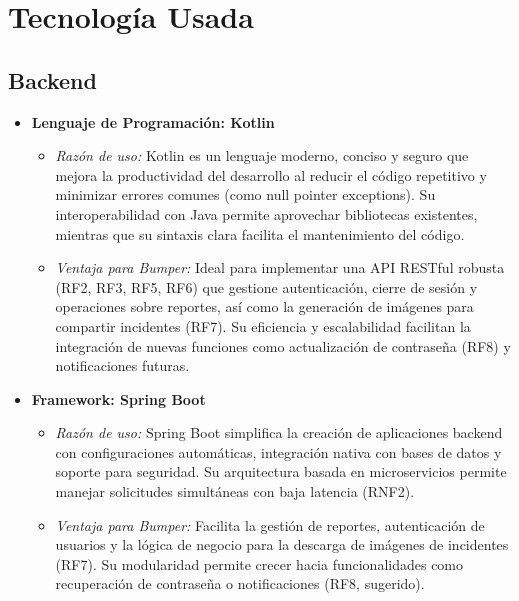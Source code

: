 \section{Tecnología Usada}

\subsection*{Backend}
\begin{itemize}
    \item \textbf{Lenguaje de Programación: Kotlin}
    \begin{itemize}
        \item \textit{Razón de uso:} Kotlin es un lenguaje moderno, conciso y seguro que mejora la productividad del desarrollo al reducir el código repetitivo y minimizar errores comunes (como null pointer exceptions). Su interoperabilidad con Java permite aprovechar bibliotecas existentes, mientras que su sintaxis clara facilita el mantenimiento del código.
        \item \textit{Ventaja para Bumper:} Ideal para implementar una API RESTful robusta (RF2, RF3, RF5, RF6) que gestione autenticación, cierre de sesión y operaciones sobre reportes, así como la generación de imágenes para compartir incidentes (RF7). Su eficiencia y escalabilidad facilitan la integración de nuevas funciones como actualización de contraseña (RF8) y notificaciones futuras.
    \end{itemize}
    \item \textbf{Framework: Spring Boot}
    \begin{itemize}
        \item \textit{Razón de uso:} Spring Boot simplifica la creación de aplicaciones backend con configuraciones automáticas, integración nativa con bases de datos y soporte para seguridad. Su arquitectura basada en microservicios permite manejar solicitudes simultáneas con baja latencia (RNF2).
        \item \textit{Ventaja para Bumper:} Facilita la gestión de reportes, autenticación de usuarios y la lógica de negocio para la descarga de imágenes de incidentes (RF7). Su modularidad permite crecer hacia funcionalidades como recuperación de contraseña o notificaciones (RF8, sugerido).
    \end{itemize}
\end{itemize}

